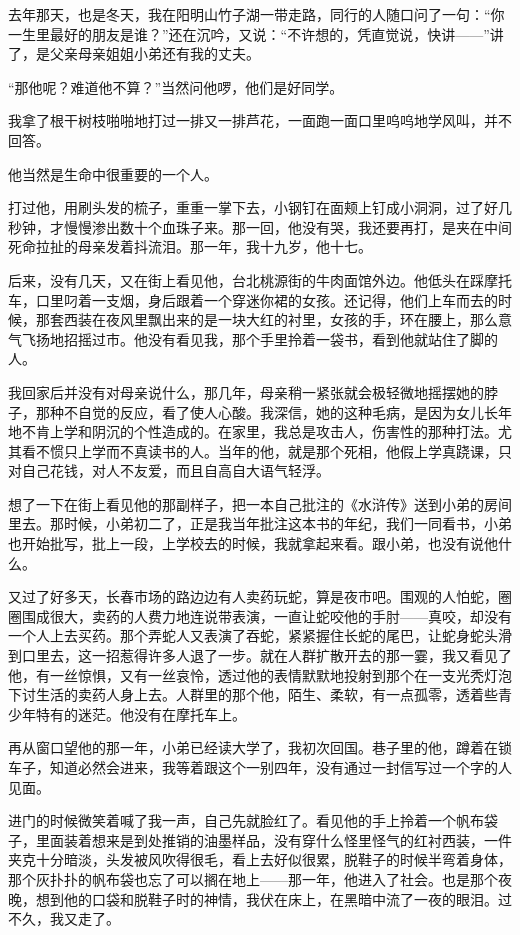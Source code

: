 \par 去年那天，也是冬天，我在阳明山竹子湖一带走路，同行的人随口问了一句：“你一生里最好的朋友是谁？”还在沉吟，又说：“不许想的，凭直觉说，快讲——”讲了，是父亲母亲姐姐小弟还有我的丈夫。
\par “那他呢？难道他不算？”当然问他啰，他们是好同学。
\par 我拿了根干树枝啪啪地打过一排又一排芦花，一面跑一面口里呜呜地学风叫，并不回答。
\par 他当然是生命中很重要的一个人。
\par 打过他，用刷头发的梳子，重重一掌下去，小钢钉在面颊上钉成小洞洞，过了好几秒钟，才慢慢渗出数十个血珠子来。那一回，他没有哭，我还要再打，是夹在中间死命拉扯的母亲发着抖流泪。那一年，我十九岁，他十七。
\par 后来，没有几天，又在街上看见他，台北桃源街的牛肉面馆外边。他低头在踩摩托车，口里叼着一支烟，身后跟着一个穿迷你裙的女孩。还记得，他们上车而去的时候，那套西装在夜风里飘出来的是一块大红的衬里，女孩的手，环在腰上，那么意气飞扬地招摇过市。他没有看见我，那个手里拎着一袋书，看到他就站住了脚的人。
\par 我回家后并没有对母亲说什么，那几年，母亲稍一紧张就会极轻微地摇摆她的脖子，那种不自觉的反应，看了使人心酸。我深信，她的这种毛病，是因为女儿长年地不肯上学和阴沉的个性造成的。在家里，我总是攻击人，伤害性的那种打法。尤其看不惯只上学而不真读书的人。当年的他，就是那个死相，他假上学真跷课，只对自己花钱，对人不友爱，而且自高自大语气轻浮。
\par 想了一下在街上看见他的那副样子，把一本自己批注的《水浒传》送到小弟的房间里去。那时候，小弟初二了，正是我当年批注这本书的年纪，我们一同看书，小弟也开始批写，批上一段，上学校去的时候，我就拿起来看。跟小弟，也没有说他什么。
\par 又过了好多天，长春市场的路边边有人卖药玩蛇，算是夜市吧。围观的人怕蛇，圈圈围成很大，卖药的人费力地连说带表演，一直让蛇咬他的手肘——真咬，却没有一个人上去买药。那个弄蛇人又表演了吞蛇，紧紧握住长蛇的尾巴，让蛇身蛇头滑到口里去，这一招惹得许多人退了一步。就在人群扩散开去的那一霎，我又看见了他，有一丝惊惧，又有一丝哀怜，透过他的表情默默地投射到那个在一支光秃灯泡下讨生活的卖药人身上去。人群里的那个他，陌生、柔软，有一点孤零，透着些青少年特有的迷茫。他没有在摩托车上。
\par 再从窗口望他的那一年，小弟已经读大学了，我初次回国。巷子里的他，蹲着在锁车子，知道必然会进来，我等着跟这个一别四年，没有通过一封信写过一个字的人见面。
\par 进门的时候微笑着喊了我一声，自己先就脸红了。看见他的手上拎着一个帆布袋子，里面装着想来是到处推销的油墨样品，没有穿什么怪里怪气的红衬西装，一件夹克十分暗淡，头发被风吹得很毛，看上去好似很累，脱鞋子的时候半弯着身体，那个灰扑扑的帆布袋也忘了可以搁在地上——那一年，他进入了社会。也是那个夜晚，想到他的口袋和脱鞋子时的神情，我伏在床上，在黑暗中流了一夜的眼泪。过不久，我又走了。

